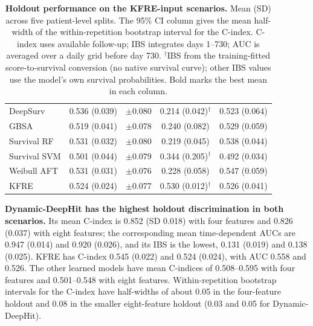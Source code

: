 \begin{table}[h!]
\begin{tabular}{@{}lcccc@{}}
DeepSurv & 0.536 (0.039) & $\pm$0.080 & 0.214 (0.042)$^{\dagger}$ & 0.523 (0.064) \\
GBSA & 0.519 (0.041) & $\pm$0.078 & 0.240 (0.082) & 0.529 (0.059) \\
Survival RF & 0.531 (0.032) & $\pm$0.080 & 0.219 (0.045) & 0.538 (0.044) \\
Survival SVM & 0.501 (0.044) & $\pm$0.079 & 0.344 (0.205)$^{\dagger}$ & 0.492 (0.034) \\
Weibull AFT & 0.531 (0.031) & $\pm$0.076 & 0.228 (0.058) & 0.547 (0.059) \\
KFRE & 0.524 (0.024) & $\pm$0.077 & 0.530 (0.012)$^{\dagger}$ & 0.526 (0.041) \\
\bottomrule
\end{tabular}
\caption{{\bf Holdout performance on the KFRE-input scenarios.} Mean (SD) across five patient-level splits. The 95\% CI column gives the mean half-width of the within-repetition bootstrap interval for the C-index. C-index uses available follow-up; IBS integrates days 1--730; AUC is averaged over a daily grid before day 730. $^{\dagger}$IBS from the training-fitted score-to-survival conversion (no native survival curve); other IBS values use the model's own survival probabilities. Bold marks the best mean in each column.}
\label{tab:discrimination}
\end{table}

\textbf{Dynamic-DeepHit has the highest holdout discrimination in both scenarios.} Its mean C-index is 0.852 (SD 0.018) with four features and 0.826 (0.037) with eight features; the corresponding mean time-dependent AUCs are 0.947 (0.014) and 0.920 (0.026), and its IBS is the lowest, 0.131 (0.019) and 0.138 (0.025). KFRE has C-index 0.545 (0.022) and 0.524 (0.024), with AUC 0.558 and 0.526. The other learned models have mean C-indices of 0.508--0.595 with four features and 0.501--0.548 with eight features. Within-repetition bootstrap intervals for the C-index have half-widths of about 0.05 in the four-feature holdout and 0.08 in the smaller eight-feature holdout (0.03 and 0.05 for Dynamic-DeepHit).

